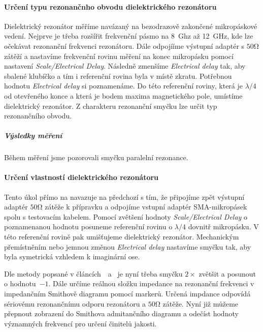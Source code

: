 \documentclass[11pt,a4paper]{article}
\newcommand{\Ohm}{\mathrm{\Omega}}
\begin{document}
\paragraph*{Určení typu rezonančnho obvodu dielektrického rezonátoru} Dielektrický rezonátor měříme navázaný na bezodrazově zakončené mikropáskové vedení. Nejprve je třeba rozšířit frekvenční pásmo na 8~Ghz až 12~GHz, kde lze očekávat rezonanční frekvenci rezonátoru. Dále odpojííme výstupní adaptér s $50\Ohm$ zátěží a nastavíme frekvenční rovinu měření na konec mikropásku pomocí nastavení \emph{Scale/Electrical Delay}. Následně zmenšíme \emph{Electrical delay} tak, aby sbalené klubíčko a tím i referenční rovina byla v místě zkratu. Potřebnou hodnotu \emph{Electrical delay} si poznamenáme. Do této referenční roviny, která je $\lambda/4$ od otevřeného konce a která je bodem maxima magnetického pole, umístíme dielektrický rezonátor. Z charakteru rezonanční smyčku lze určit typ rezonančního obvodu.

\subparagraph*{Výsledky měření} Během měření jsme pozorovali smyčku paralelní rezonance.

\paragraph*{Určení vlastností dielektrického rezonátoru} Tento úkol přímo na navazuje na předchozí s tím, že připojíme zpět výstupní adaptér $50\Ohm$ zátěže k přípravku a odpojíme vstupní adaptér SMA-mikropásek spolu s testovacím kabelem. Pomocí zvětšení hodnoty \emph{Scale/Electrical Delay} o poznamenanou hodnotu posuneme referenční rovinu o $\lambda/4$ dovnitř mikropásku. V této referenční rovině pak umišťujeme dielektrický rezonátor. Mechanickým přemístněním nebo jemnou změnou \emph{Electrical delay} nastavíme smyčku tak, aby byla symetrická vzhledem k imaginární ose.

Dle metody popsané v článcích~\cite{khanna-garault:determination-of-q}~a~\cite{khanna:q-measurement-of-coupled-microstrips} je nyní třeba smyčku $2\times$ zvětšit a posunout o hodnotu~$-1$. Dále určíme reálnou složku impedance na rezonanční frekvenci v impedančním Smithově diagramu pomocí markerů. Určená impdance odpovídá sériovému rezonančnímu odporu rezonátoru a $50\Ohm$ zátěže. Nyní již můžeme přepnout zobrazení do Smithova admitančního diagramu a odečíst hodnoty významných frekvencí pro určení činitelů jakosti.
\end{document}
